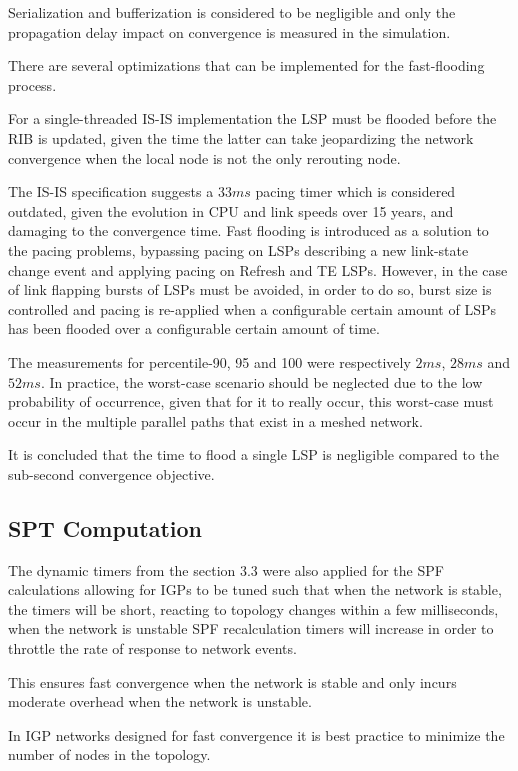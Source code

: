 \documentclass[a4paper, 11pt]{article}
\begin{document}
Serialization and bufferization is considered to be negligible and only the propagation delay impact on convergence is measured in the simulation.

There are several optimizations that can be implemented for the fast-flooding process.

For a single-threaded IS-IS implementation the LSP must be flooded before the RIB is updated, given the time the latter can take jeopardizing the network convergence when the local node is not the only rerouting node.

The IS-IS specification suggests a $33ms$ pacing timer which is considered outdated, given the evolution in CPU and link speeds over 15 years, and damaging to the convergence time.
Fast flooding is introduced as a solution to the pacing problems, bypassing pacing on LSPs describing a new link-state change event and applying pacing on Refresh and TE LSPs. 
However, in the case of link flapping bursts of LSPs must be avoided, in order to do so,
burst size is controlled and pacing is re-applied when a configurable certain amount of LSPs has been flooded over a configurable certain amount of time.

The measurements for percentile-90, 95 and 100 were respectively $2ms$, $28ms$ and $52ms$.
In practice, the worst-case scenario should be neglected due to the low probability of occurrence,
given that for it to really occur, this worst-case must occur in the multiple parallel paths that exist in a meshed network.

It is concluded that the time to flood a single LSP is negligible compared to the sub-second convergence objective.

\subsection{SPT Computation}
The dynamic timers from the section 3.3 were also applied for the SPF calculations allowing for IGPs to be tuned such that when the network is stable, 
the timers will be short, reacting to topology changes within a few milliseconds, 
when the network is unstable SPF recalculation timers will increase in order to throttle the rate of response to network events.

This ensures fast convergence when the network is stable and only incurs moderate overhead when the network is unstable.

In IGP networks designed for fast convergence it is best practice to minimize the number of nodes in the topology.
\end{document}

